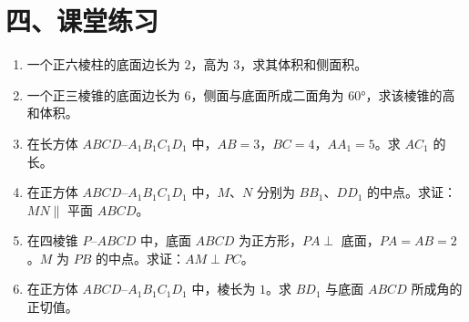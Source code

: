 \documentclass[12pt, a4paper]{ctexart}
\begin{document}
\section*{\textcolor{tipgreen}{四、课堂练习}}

\begin{enumerate}[leftmargin=2em, label=\textbf{\arabic*.}]
  \item 一个正六棱柱的底面边长为 $2$，高为 $3$，求其体积和侧面积。

  \item 一个正三棱锥的底面边长为 $6$，侧面与底面所成二面角为 $60°$，求该棱锥的高和体积。

  \item 在长方体 $ABCD$--$A_1B_1C_1D_1$ 中，$AB = 3$，$BC = 4$，$AA_1 = 5$。求 $AC_1$ 的长。

  \item 在正方体 $ABCD$--$A_1B_1C_1D_1$ 中，$M$、$N$ 分别为 $BB_1$、$DD_1$ 的中点。求证：$MN \parallel$ 平面 $ABCD$。

  \item 在四棱锥 $P$--$ABCD$ 中，底面 $ABCD$ 为正方形，$PA \perp$ 底面，$PA = AB = 2$。$M$ 为 $PB$ 的中点。求证：$AM \perp PC$。

  \item 在正方体 $ABCD$--$A_1B_1C_1D_1$ 中，棱长为 $1$。求 $BD_1$ 与底面 $ABCD$ 所成角的正切值。
\end{enumerate}
\end{document}
